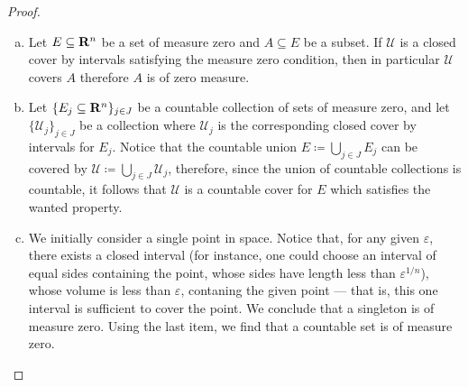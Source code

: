 \begin{proof}
    \begin{enumerate}[(a)]\setlength\itemsep{0em}
        \item Let \(E \subseteq \mathbf{R}^n\) be a set of measure zero and \(A \subseteq E\) be
              a subset. If \(\mathcal U\) is a closed cover by intervals satisfying the
              measure zero condition, then in particular \(\mathcal U\) covers \(A\)
              therefore \(A\) is of zero measure.

        \item Let \(\{E_{j} \subseteq \mathbf{R}^{n}\}_{j \in J}\) be a countable collection of
              sets of measure zero, and let \(\{\mathcal U_{j}\}_{j \in J}\) be a collection
              where \(\mathcal U_j\) is the corresponding closed cover by intervals for
              \(E_j\). Notice that the countable union \(E \coloneq \bigcup_{j \in J} E_j\)
              can be covered by \(\mathcal U \coloneq \bigcup_{j \in J} \mathcal U_j\),
              therefore, since the union of countable collections is countable, it follows
              that \(\mathcal U\) is a countable cover for \(E\) which satisfies the wanted
              property.

        \item We initially consider a single point in space. Notice that, for any given
              \(\varepsilon\), there exists a closed interval (for instance, one could
              choose an interval of equal sides containing the point, whose sides have
              length less than \(\varepsilon^{1/n}\)), whose volume is less than
              \(\varepsilon\), contaning the given point --- that is, this one interval is
              sufficient to cover the point. We conclude that a singleton is of measure
              zero. Using the last item, we find that a countable set is of measure zero.


\end{enumerate}
\end{proof}
